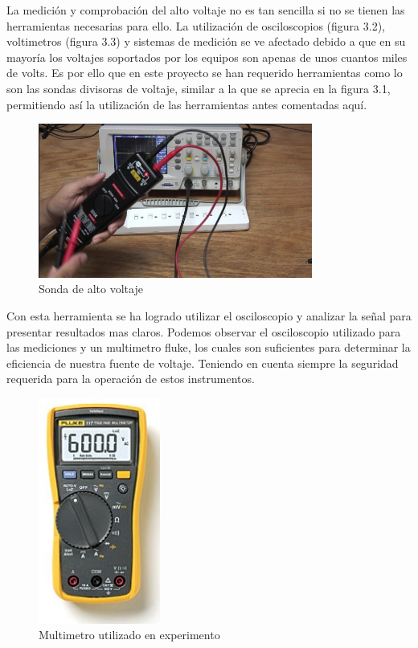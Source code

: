La medición y comprobación del alto voltaje no es tan sencilla si no se tienen las herramientas necesarias para ello. La utilización de osciloscopios (figura 3.2), voltimetros (figura 3.3) y sistemas de medición se ve afectado debido a que en su mayoría los voltajes soportados por los equipos son apenas de unos cuantos miles de volts. Es por ello que en este proyecto se han requerido herramientas como lo son las sondas divisoras de voltaje, similar a la que se aprecia en la figura 3.1, permitiendo así la utilización de las herramientas antes comentadas aquí.\\

\begin{figure}[H]
\centering
\includegraphics[width=9cm]{Capitulo3/figs/sonda.png}
\caption{Sonda de alto voltaje}
\end{figure}

Con esta herramienta se ha logrado utilizar el osciloscopio y analizar la señal para presentar resultados mas claros. Podemos observar el osciloscopio utilizado para las mediciones y un multimetro fluke, los cuales son suficientes para determinar la eficiencia de nuestra fuente de voltaje. Teniendo en cuenta siempre la seguridad requerida para la operación de estos instrumentos.


\begin{figure}[H]
\centering
\includegraphics[width=4cm]{Capitulo3/figs/multim.png}
\caption{Multimetro utilizado en experimento}
\end{figure}

